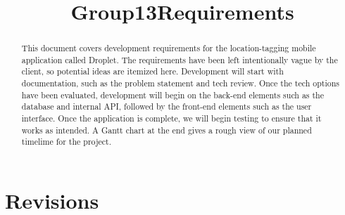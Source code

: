 \documentclass[draftclsnofoot, onecolumn,journal,letterpaper,10pt, compsoc]{IEEEtran}
\title{Group13Requirements}
\def \TitlePageHeader{Droplet Productions}
\def \TitlePageTitle{Requirements}
\def \GroupNumber{by Group 13}
\def \GroupMembers{James Barry, Tarren Engberg, Dennis Li, James Luo,  Brice Ng}
\def \ClientSignature {David Vasquez has approved this document}
\def \CourseTitle{CS 463 - Senior Design}
\def \CourseTerm{Spring 2019}
\newcommand{\NameSigPair}[1]{\par
\makebox[2.75in][r]{#1} \hfil 	\makebox[3.25in]{\makebox[2.25in]{\hrulefill} \hfill		\makebox[.75in]{\hrulefill}}
\par\vspace{-12pt} \textit{\tiny\noindent
\makebox[2.75in]{} \hfil		\makebox[3.25in]{\makebox[2.25in][r]{Signature} \hfill	\makebox[.75in][r]{Date}}}}
\renewcommand{\NameSigPair}[1]{#1}
\begin{document}
\begin{titlepage}
    \begin{singlespace}
        \hfill    
        \par\vspace{.2in}
        \centering
        \scshape{
            \huge \TitlePageHeader \par
            {\large\today}\par
            \vspace{.5in}
            \textbf{\Huge \TitlePageTitle }\par
            \vfill
            \vspace{5pt}

            \vspace{5pt}
            {\Large
                \NameSigPair{\GroupNumber}\par
            	\NameSigPair{\GroupMembers}\par
            	\NameSigPair{\textbf{\ClientSignature\par}}
                \NameSigPair{\CourseTitle}\par
                \NameSigPair{\CourseTerm}\par
            }
            \vspace{20pt}
        }
    \end{singlespace}
    \begin{abstract}
    This document covers development requirements for the location-tagging mobile application called Droplet. The requirements have been left intentionally vague by the client, so potential ideas are itemized here. Development will start with documentation, such as the problem statement and tech review. Once the tech options have been evaluated, development will begin on the back-end elements such as the database and internal API, followed by the front-end elements such as the user interface. Once the application is complete, we will begin testing to ensure that it works as intended. A Gantt chart at the end gives a rough view of our planned timelime for the project.
    \end{abstract}
\end{titlepage}

\newpage
{}
\clearpage

\pagebreak

\tableofcontents

\pagebreak

\section{Revisions}
\end{document}
